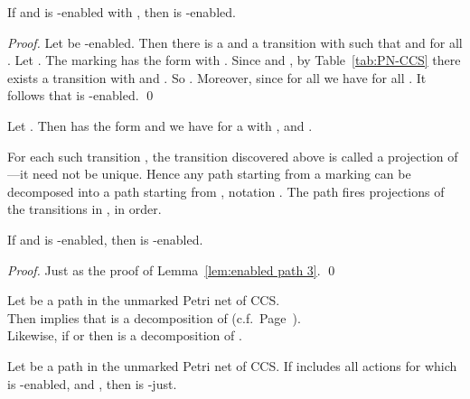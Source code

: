 \documentclass[smallcondensed]{svjour3}
\newcommand{\Lem}[1]{Lemma~\ref{lem:#1}}
\newcommand{\Tab}[1]{Table~\ref{tab:#1}}
\begin{document}
\begin{lemma}\label{lem:enabled path 3}
If  and  is -enabled with , then  is -enabled.
\end{lemma}
\begin{proof}
Let  be -enabled. Then there is a  and a transition  with
 such that  and  for all .
Let . 
The marking  has the form  with .
Since  and , by \Tab{PN-CCS} there exists a transition  with
 and . So .
Moreover, since  for all  we have  for all . It follows that  is -enabled.
\qed
\end{proof}

\begin{observation}\label{obs:decompose relabelling}\rm
Let .
Then  has the form  and we have
 for a  with ,
 and .
\end{observation}
For each such transition , the transition  discovered above is called a projection of ---it
need not be unique.
Hence any path  starting from a marking  can be decomposed into a 
path  starting from , notation . 
The path  fires projections of the transitions in , in order.

\begin{lemma}\label{lem:enabled path 4}
If  and  is -enabled, then  is -enabled.
\end{lemma}
\begin{proof}
Just as the proof of \Lem{enabled path 3}.
\qed
\end{proof}

\begin{observation}\label{obs:decompose projection}\rm
Let  be a path in the unmarked Petri net of CCS.\\
Then  implies 
{that   is a decomposition of  (c.f.\ Page~\hyperlink{hr:decomp}{\pageref*{pg:decomp}})}.
\\
Likewise, if  or  then  is a
decomposition of .
\end{observation}

\begin{proposition}\label{prop:enabled just}
Let  be a path in the unmarked Petri net of CCS.
If  includes all actions  for which  is -enabled, and ,
then  is -just.
\end{proposition}
\end{document}
